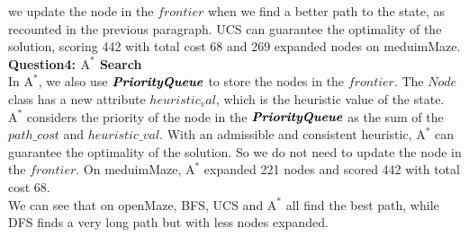 \documentclass[UTF8]{ctexart}
\begin{document}
we update the node in the $frontier$ when we find a better path to the state, as recounted in the previous paragraph.
UCS can guarantee the optimality of the solution, scoring 442 with total cost 68 and 269 expanded nodes on meduimMaze.\\
\textbf{Question4: $\text{A}^*$ Search}\\
In $\text{A}^*$, we also use $\textbf{\textit{PriorityQueue}}$ to store the nodes in the $frontier$. The $Node$ class has a new attribute $heuristic_val$, which is the heuristic value of the state. $\text{A}^*$ considers 
the priority of the node in the $\textbf{\textit{PriorityQueue}}$ as the sum of the $path\_cost$ and $heuristic\_val$. With an admissible and consistent heuristic, $\text{A}^*$ can guarantee the optimality of the solution.
So we do not need to update the node in the $frontier$. On meduimMaze, $\text{A}^*$ expanded 221 nodes and scored 442 with total cost 68.\\
We can see that on openMaze, BFS, UCS and $\text{A}^*$ all find the best path, while DFS finds a very long path but with less nodes expanded.
\end{document}
